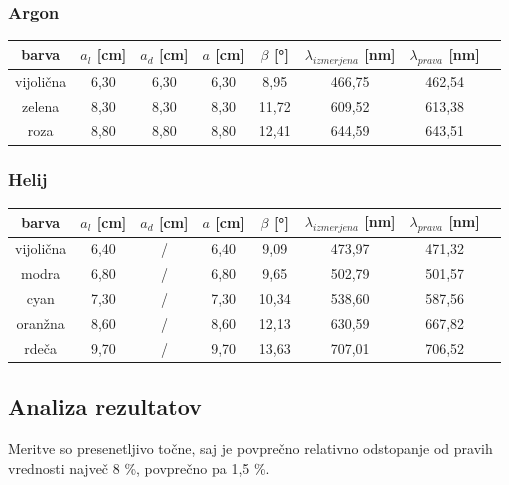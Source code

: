 \documentclass[12pt]{article}
\begin{document}
	\subsubsection*{Argon}
	\begin{table}[h!]
		\centering
		\begin{tabular}{|c|c|c|c|c|c|c|c|}
			\hline
			barva 		& $a_l$ [cm]	& $a_d$ [cm]	& $a$ [cm]	& $\beta$ [°]	& $\lambda_{izmerjena}$ [nm]	& $\lambda_{prava}$ [nm]		\\ \hline
			vijolična	& 6,30 			& 6,30 			& 6,30		& 8,95			& 466,75						& 462,54 \cite{specters-nist}	\\ \hline
			zelena		& 8,30 			& 8,30 			& 8,30		& 11,72			& 609,52						& 613,38 \cite{specters-nist}	\\ \hline
			roza		& 8,80 			& 8,80 			& 8,80		& 12,41			& 644,59						& 643,51 \cite{specters-nist}	\\ \hline
		\end{tabular}
	\end{table}

	\subsubsection*{Helij}
	\begin{table}[h!]
		\centering
		\begin{tabular}{|c|c|c|c|c|c|c|c|}
			\hline
			barva		& $a_l$ [cm]	& $a_d$ [cm]	& $a$ [cm]	& $\beta$ [°]	& $\lambda_{izmerjena}$ [nm]	& $\lambda_{prava}$ [nm]		\\ \hline
			vijolična	& 6,40			& / 			& 6,40		&  9,09			& 473,97						& 471,32 \cite{specters-nist}	\\ \hline
			modra		& 6,80			& / 			& 6,80		&  9,65			& 502,79						& 501,57 \cite{specters-nist}	\\ \hline
			cyan		& 7,30			& / 			& 7,30		& 10,34			& 538,60						& 587,56 \cite{specters-nist}	\\ \hline
			oranžna		& 8,60			& / 			& 8,60		& 12,13			& 630,59						& 667,82 \cite{specters-nist}	\\ \hline
			rdeča		& 9,70			& /				& 9,70		& 13,63			& 707,01						& 706,52 \cite{specters-nist}	\\ \hline
		\end{tabular}
	\end{table}

	\null
	\subsection*{Analiza rezultatov}
	Meritve so presenetljivo točne, saj je povprečno relativno odstopanje od pravih vrednosti
	največ 8 \%, povprečno pa 1,5 \%. 
\end{document}
